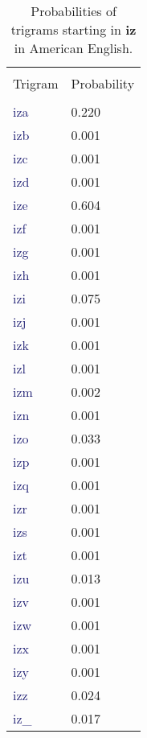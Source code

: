 \documentclass[
12pt,
a4paper,
oneside,
headinclude,
footinclude]{article}
\theoremstyle{definition} %
\begin{document}
\begin{table}[h]
    \centering %
    \begin{tabular}{l l} %
        \hline
        \hline 
        \\[-1.5ex]
        \textcolor{BrickRed}{Trigram} & \textcolor{BrickRed}{Probability}\\ [0.5ex]
        \hline %
        \\[-1.5ex]
        \textcolor{MidnightBlue}{iza} & 0.220 \\
        \textcolor{MidnightBlue}{izb} & 0.001 \\
        \textcolor{MidnightBlue}{izc} & 0.001 \\
        \textcolor{MidnightBlue}{izd} & 0.001 \\
        \textcolor{MidnightBlue}{ize} & 0.604 \\
        \textcolor{MidnightBlue}{izf} & 0.001 \\
        \textcolor{MidnightBlue}{izg} & 0.001 \\
        \textcolor{MidnightBlue}{izh} & 0.001 \\
        \textcolor{MidnightBlue}{izi} & 0.075 \\
        \textcolor{MidnightBlue}{izj} & 0.001 \\
        \textcolor{MidnightBlue}{izk} & 0.001 \\
        \textcolor{MidnightBlue}{izl} & 0.001 \\
        \textcolor{MidnightBlue}{izm} & 0.002 \\
        \textcolor{MidnightBlue}{izn} & 0.001 \\
        \textcolor{MidnightBlue}{izo} & 0.033 \\
        \textcolor{MidnightBlue}{izp} & 0.001 \\
        \textcolor{MidnightBlue}{izq} & 0.001 \\
        \textcolor{MidnightBlue}{izr} & 0.001 \\
        \textcolor{MidnightBlue}{izs} & 0.001 \\
        \textcolor{MidnightBlue}{izt} & 0.001 \\
        \textcolor{MidnightBlue}{izu} & 0.013 \\
        \textcolor{MidnightBlue}{izv} & 0.001 \\
        \textcolor{MidnightBlue}{izw} & 0.001 \\
        \textcolor{MidnightBlue}{izx} & 0.001 \\
        \textcolor{MidnightBlue}{izy} & 0.001 \\
        \textcolor{MidnightBlue}{izz} & 0.024 \\
        \textcolor{MidnightBlue}{iz\_} & 0.017 \\
        [1ex] %
        \hline %
        \end{tabular}
        \caption{\label{tab:table-prob-us}Probabilities of trigrams starting in \textbf{iz} in American English.}
\end{table} 
\end{document}
